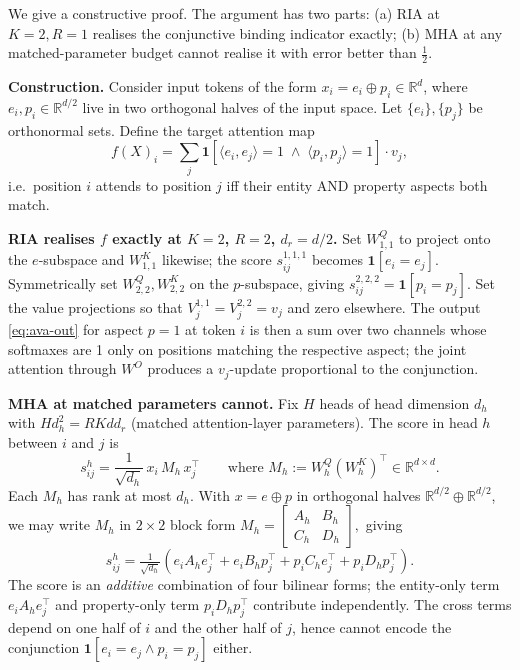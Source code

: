 \documentclass{article}
\newcommand{\R}{\mathbb{R}}
\begin{document}
We give a constructive proof. The argument has two parts: (a) RIA at
$K{=}2, R{=}1$ realises the conjunctive binding indicator exactly;
(b) MHA at any matched-parameter budget cannot realise it with error
better than $\tfrac{1}{2}$.

\textbf{Construction.}
Consider input tokens of the form $x_i = e_i \oplus p_i \in \R^d$,
where $e_i, p_i \in \R^{d/2}$ live in two orthogonal halves of the
input space. Let $\{e_i\}, \{p_j\}$ be orthonormal sets. Define the
target attention map
\[
  f(X)_i = \sum_j \mathbf{1}\!\left[ \langle e_i, e_j \rangle = 1
                                \;\wedge\; \langle p_i, p_j \rangle = 1 \right]
                   \cdot v_j,
\]
i.e.\ position $i$ attends to position $j$ iff their entity AND
property aspects both match.

\textbf{RIA realises $f$ exactly at $K{=}2$, $R{=}2$, $d_r{=}d/2$.}
Set $W^Q_{1, 1}$ to project onto the $e$-subspace and $W^K_{1, 1}$
likewise; the score $s^{1,1,1}_{ij}$ becomes $\mathbf{1}[e_i = e_j]$.
Symmetrically set $W^Q_{2, 2}, W^K_{2, 2}$ on the $p$-subspace, giving
$s^{2,2,2}_{ij} = \mathbf{1}[p_i = p_j]$. Set the value projections so
that $V^{1,1}_j = V^{2,2}_j = v_j$ and zero elsewhere. The output
\eqref{eq:ava-out} for aspect $p{=}1$ at token $i$ is then a sum over
two channels whose softmaxes are 1 only on positions matching the
respective aspect; the joint attention through $W^O$ produces a
$v_j$-update proportional to the conjunction.

\textbf{MHA at matched parameters cannot.} Fix $H$ heads of head
dimension $d_h$ with $H d_h^2 = R K d d_r$ (matched attention-layer
parameters). The score in head $h$ between $i$ and $j$ is
\[
  s^h_{ij} = \frac{1}{\sqrt{d_h}}\, x_i\, M_h\, x_j^\top
  \qquad \text{where } M_h := W^Q_h (W^K_h)^\top \in \R^{d \times d}.
\]
Each $M_h$ has rank at most $d_h$. With $x = e \oplus p$ in
orthogonal halves $\R^{d/2} \oplus \R^{d/2}$, we may write $M_h$ in
$2{\times}2$ block form
\(
  M_h = \begin{bmatrix} A_h & B_h \\ C_h & D_h \end{bmatrix},
\)
giving
\[
  s^h_{ij} = \tfrac{1}{\sqrt{d_h}}\!\left(
    e_i A_h e_j^\top
  + e_i B_h p_j^\top
  + p_i C_h e_j^\top
  + p_i D_h p_j^\top \right).
\]
The score is an \emph{additive} combination of four bilinear forms;
the entity-only term $e_i A_h e_j^\top$ and property-only term
$p_i D_h p_j^\top$ contribute independently. The cross terms depend
on one half of $i$ and the other half of $j$, hence cannot encode the
conjunction $\mathbf{1}[e_i=e_j \wedge p_i=p_j]$ either.
\end{document}
